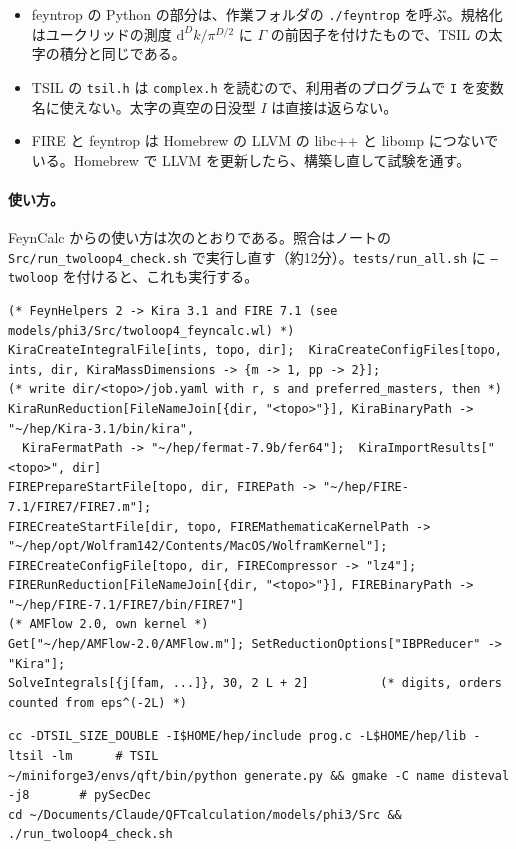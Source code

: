 \documentclass[a4paper,10pt]{ltjsarticle}
\begin{document}
\begin{itemize}
\item feyntrop の Python の部分は、作業フォルダの \texttt{./feyntrop} を呼ぶ。規格化はユークリッドの測度 $\mathrm{d}^Dk/\pi^{D/2}$ に $\Gamma$ の前因子を付けたもので、TSIL の太字の積分と同じである。
\item TSIL の \texttt{tsil.h} は \texttt{complex.h} を読むので、利用者のプログラムで \texttt{I} を変数名に使えない。太字の真空の日没型 $I$ は直接は返らない。
\item FIRE と feyntrop は Homebrew の LLVM の libc++ と libomp につないでいる。Homebrew で LLVM を更新したら、構築し直して試験を通す。
\end{itemize}

\paragraph{使い方。}FeynCalc からの使い方は次のとおりである。照合はノートの \nolinkurl{Src/run_twoloop4_check.sh} で実行し直す（約12分）。\texttt{tests/run\_all.sh} に \texttt{--twoloop} を付けると、これも実行する。
\begin{Verbatim}
(* FeynHelpers 2 -> Kira 3.1 and FIRE 7.1 (see models/phi3/Src/twoloop4_feyncalc.wl) *)
KiraCreateIntegralFile[ints, topo, dir];  KiraCreateConfigFiles[topo, ints, dir, KiraMassDimensions -> {m -> 1, pp -> 2}];
(* write dir/<topo>/job.yaml with r, s and preferred_masters, then *)
KiraRunReduction[FileNameJoin[{dir, "<topo>"}], KiraBinaryPath -> "~/hep/Kira-3.1/bin/kira",
  KiraFermatPath -> "~/hep/fermat-7.9b/fer64"];  KiraImportResults["<topo>", dir]
FIREPrepareStartFile[topo, dir, FIREPath -> "~/hep/FIRE-7.1/FIRE7/FIRE7.m"];
FIRECreateStartFile[dir, topo, FIREMathematicaKernelPath -> "~/hep/opt/Wolfram142/Contents/MacOS/WolframKernel"];
FIRECreateConfigFile[topo, dir, FIRECompressor -> "lz4"];
FIRERunReduction[FileNameJoin[{dir, "<topo>"}], FIREBinaryPath -> "~/hep/FIRE-7.1/FIRE7/bin/FIRE7"]
(* AMFlow 2.0, own kernel *)
Get["~/hep/AMFlow-2.0/AMFlow.m"]; SetReductionOptions["IBPReducer" -> "Kira"];
SolveIntegrals[{j[fam, ...]}, 30, 2 L + 2]          (* digits, orders counted from eps^(-2L) *)
\end{Verbatim}
\begin{Verbatim}
cc -DTSIL_SIZE_DOUBLE -I$HOME/hep/include prog.c -L$HOME/hep/lib -ltsil -lm      # TSIL
~/miniforge3/envs/qft/bin/python generate.py && gmake -C name disteval -j8       # pySecDec
cd ~/Documents/Claude/QFTcalculation/models/phi3/Src && ./run_twoloop4_check.sh
\end{Verbatim}
\end{document}
